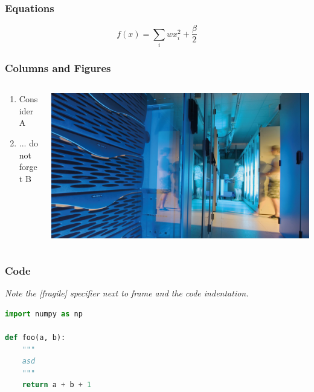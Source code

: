 \documentclass[aspectratio=1610]{beamer}
\begin{document}
\begin{frame}
\frametitle{Equations}

    \begin{equation*}
        f(x) = \sum_i wx_i^2 + \frac{\beta}{2}
    \end{equation*}
\end{frame}


\begin{frame}
    \frametitle{Columns and Figures}

    \begin{columns}
        \begin{column}{0.4\textwidth}
            \begin{enumerate}
                \item Consider A
                \item ... do not forget B
            \end{enumerate}
        \end{column}
        \begin{column}{0.4\textwidth}
            \centering
            \includegraphics[width=\textwidth]{logos/hgf_key_technologies.jpg}
        \end{column}
    \end{columns}
\end{frame}

\begin{frame}[fragile]
    \frametitle{Code}
    
    \emph{Note the [fragile] specifier next to frame and the code indentation.}
    
\begin{lstlisting}[language=Python]
import numpy as np

def foo(a, b):
    """
    asd
    """
    return a + b + 1
\end{lstlisting}
\end{frame}
\end{document}
